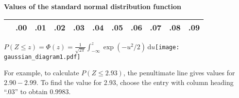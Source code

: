 \documentclass[a4paper]{article}
\begin{document}
\begin{center}
  {\Large\bf Values of the standard normal distribution function}
\end{center}


\pagestyle{empty}
\thispagestyle{empty}
\begin{centering}
\begin{tabular}{r|llllllllll}
  \hline \rule{0mm}{4mm}
  & {\large .00} & {\large .01} & {\large .02} & {\large .03} & {\large .04}
  & {\large .05} & {\large .06} & {\large .07} & {\large .08} & {\large .09}
  \vphantom{$y_{y_{y_y}}$} \\  \hline
  \hline
\end{tabular}
\end{centering}

\noindent
\(\displaystyle P(Z\leqslant z)=\Phi(z)=\frac{1}{\sqrt{2\pi}}\int_{-\infty}^z\exp\left(-u^2/2\right)\,\mathrm{d}u\)\hfill\hbox{\texttt{[image: gaussian\_diagram1.pdf]}}

\noindent For example, to calculate \(P(Z\leqslant 2.93)\), the penultimate
line gives values for \(2.90-2.99\).  To find the value for 2.93,
choose the entry with column heading ``.03'' to obtain 0.9983.

\end{document}
